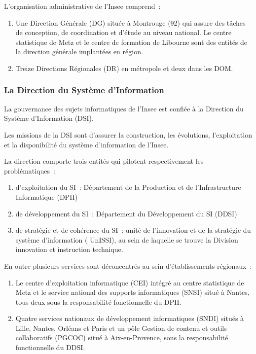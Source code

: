 L'organisation administrative de l'Insee comprend~:
\begin{enumerate}
    \item Une Direction Générale (DG) située à Montrouge (92) qui assure des tâches de conception, de coordination et d'étude au niveau national. Le centre statistique de Metz et le centre de formation de Libourne sont des entités de la direction générale implantées en région.
    \item Treize Directions Régionales (DR) en métropole et deux dans les DOM.
\end{enumerate}

\subsubsection*{La Direction du Système d'Information}

La gouvernance des sujets informatiques de l’Insee est confiée à la Direction du Système d'Information (DSI). 
\newline

Les missions de la DSI sont d’assurer la construction, les évolutions, l'exploitation et la disponibilité du système d'information de l'Insee.
\newline

La direction comporte trois entités qui pilotent respectivement les problématiques~:
\begin{enumerate}
    \item d'exploitation du SI~: Département de la Production et de l'Infrastructure Informatique (DPII)
    \item de développement du SI~: Département du Développement du SI (DDSI)
    \item de stratégie et de cohérence du SI~: unité de l'innovation et de la stratégie du système d'information ( UnISSI), au sein de laquelle se trouve la Division innovation et instruction technique.
    \newline
\end{enumerate}

En outre plusieurs services sont déconcentrés au sein d’établissements régionaux~:
\begin{enumerate}
    \item  Le centre d’exploitation informatique (CEI) intégré au centre statistique de Metz et le service national des supports informatiques (SNSI) situé à Nantes, tous deux sous la responsabilité fonctionnelle du DPII.
    \item Quatre services nationaux de développement informatiques (SNDI) situés à Lille, Nantes, Orléans et Paris et un pôle Gestion de contenu et outils collaboratifs (PGCOC) situé à Aix-en-Provence, sous la responsabilité fonctionnelle du DDSI.
\end{enumerate}

